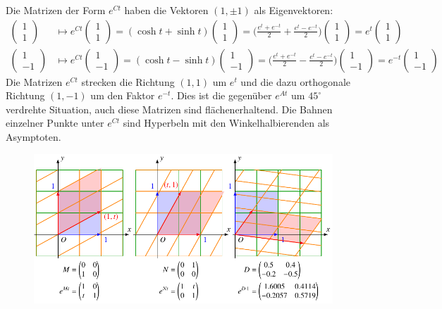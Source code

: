 \begin{beispiel}
Die Matrizen der Form $e^{Ct}$ haben die Vektoren $(1,\pm1)$ als
Eigenvektoren:
\begin{align*}
\begin{pmatrix}1\\1\end{pmatrix}
&\mapsto
e^{Ct}
\begin{pmatrix}1\\1\end{pmatrix}
=
(\cosh t +\sinh t)
\begin{pmatrix}1\\1\end{pmatrix}
=
\biggl(
\frac{e^t+e^{-t}}2
+
\frac{e^t-e^{-t}}2
\biggr)
\begin{pmatrix}1\\1\end{pmatrix}
=
e^t
\begin{pmatrix}1\\1\end{pmatrix}
\\
\begin{pmatrix}1\\-1\end{pmatrix}
&\mapsto
e^{Ct}
\begin{pmatrix}1\\-1\end{pmatrix}
=
(\cosh t -\sinh t)
\begin{pmatrix}1\\-1\end{pmatrix}
=
\biggl(
\frac{e^t+e^{-t}}2
-
\frac{e^t-e^{-t}}2
\biggr)
\begin{pmatrix}1\\-1\end{pmatrix}
=
e^{-t}
\begin{pmatrix}1\\-1\end{pmatrix}
\end{align*}
Die Matrizen $e^{Ct}$ strecken die Richtung $(1,1)$ um $e^t$ und
die dazu orthogonale Richtung $(1,-1)$ um den Faktor $e^{-t}$.
Dies ist die gegenüber $e^{At}$ um $45^\circ$ verdrehte Situation,
auch diese Matrizen sind flächenerhaltend.
Die Bahnen einzelner Punkte unter $e^{Ct}$ sind Hyperbeln mit
den Winkelhalbierenden als Asymptoten.
\begin{figure}
\centering
\includegraphics{chapters/60-gruppen/images/scherungen.pdf}

\end{figure}
\end{beispiel}
